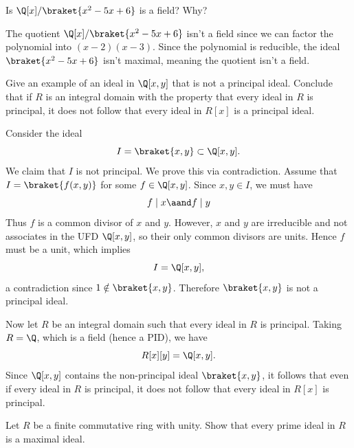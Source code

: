 \begin{problem}[31.18]
  Is $\Q[x]/\braket{x^2 - 5x + 6}$ is a field? Why?
\end{problem}

\begin{solution}
  The quotient $\Q[x]/\braket{x^2 - 5x + 6}$ isn't a field since we can factor the polynomial into $(x - 2)(x - 3)$. Since the polynomial is reducible, the ideal $\braket{x^2 - 5x + 6}$ isn't maximal, meaning the quotient isn't a field.
\end{solution}

\begin{problem}[31.24]
  Give an example of an ideal in $\Q[x, y]$ that is not a principal ideal. Conclude that if $R$ is an integral domain with the property that every ideal in $R$ is principal, it does not follow that every ideal in $R[x]$ is a principal ideal.
\end{problem}

\begin{solution}
  Consider the ideal
  \[%
    I = \braket{x, y} \subset \Q[x,y].
  \]%
  We claim that $I$ is not principal. We prove this via contradiction. Assume that $I = \braket{f(x,y)}$ for some $f \in \Q[x,y]$. Since $x, y \in I$, we must have
  \[%
    f \mid x \aand f \mid y
  \]%
  Thus $f$ is a common divisor of $x$ and $y$. However, $x$ and $y$ are irreducible and not associates in the UFD $\Q[x,y]$, so their only common divisors are units. Hence $f$ must be a unit, which implies
  \[%
    I = \Q[x,y]
  ,\]%
  a contradiction since $1 \notin \braket{x,y}$. Therefore $\braket{x,y}$ is not a principal ideal.

  Now let $R$ be an integral domain such that every ideal in $R$ is principal. Taking $R = \Q$, which is a field (hence a PID), we have
  \[%
    R[x][y] = \Q[x,y]
  .\]%
  Since $\Q[x,y]$ contains the non-principal ideal $\braket{x,y}$, it follows that even if every ideal in $R$ is principal, it does not follow that every ideal in $R[x]$ is principal.
\end{solution}

\begin{problem}[31.26]
  Let $R$ be a finite commutative ring with unity. Show that every prime ideal in $R$ is a maximal ideal.
\end{problem}

